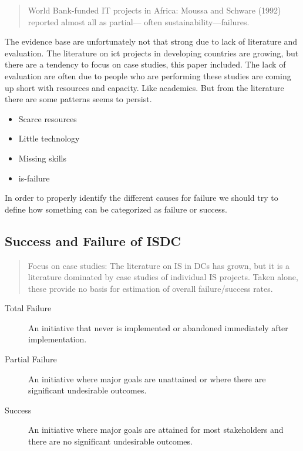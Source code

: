 \begin{quotation}
World Bank-funded IT projects in Africa: Moussa
and Schware (1992) reported almost all as partial—
often sustainability—failures.\cite{rh:isdc}
\end{quotation}

The evidence base are unfortunately not that strong due to lack of literature and evaluation.
The literature on \gls{ict} projects in developing countries are growing, but there are a tendency to focus on case studies, this paper included.
The lack of evaluation are often due to people who are performing these studies are coming up short with resources and capacity.
Like academics.
But from the literature there are some patterns seems to persist.

\begin{itemize}
\item Scarce resources
\item Little technology
\item Missing skills
\item \gls{is}-failure
\end{itemize}

In order to properly identify the different causes for failure we should try to define how something can be categorized as failure or success.

\subsection{Success and Failure of ISDC}
\begin{quotation}
Focus on case studies: The literature on IS in
DCs has grown, but it is a literature dominated by
case studies of individual IS projects. Taken alone,
these provide no basis for estimation of overall
failure/success rates.\cite{rh:isdc}
\end{quotation}
\label{successandfailure}
\begin{description}
\item[Total Failure] An initiative that never is implemented or abandoned immediately after implementation.
\item[Partial Failure] An initiative where major goals are unattained or where there are significant undesirable outcomes.
\item[Success] An initiative where major goals are attained for most stakeholders and there are no significant undesirable outcomes.
\end{description}

